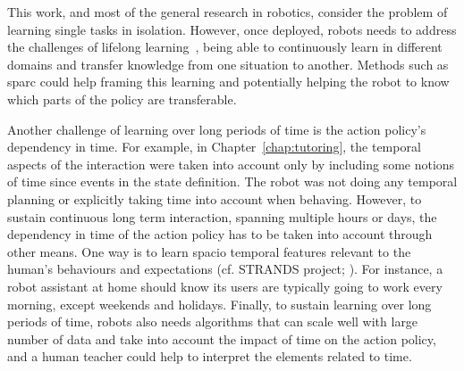 
This work, and most of the general research in robotics, consider the problem of learning single tasks in isolation. However, once deployed, robots needs to address the challenges of lifelong learning~\citep{thrun1995lifelong}, being able to continuously learn in different domains and transfer knowledge from one situation to another. Methods such as \gls{sparc} could help framing this learning and potentially helping the robot to know which parts of the policy are transferable.

Another challenge of learning over long periods of time is the action policy's dependency in time. For example, in Chapter~\ref{chap:tutoring}, the temporal aspects of the interaction were taken into account only by including some notions of time since events in the state definition. The robot was not doing any temporal planning or explicitly taking time into account when behaving. However, to sustain continuous long term interaction, spanning multiple hours or days, the dependency in time of the action policy has to be taken into account through other means. One way is to learn spacio temporal features relevant to the human's behaviours and expectations (cf. STRANDS project; \citealt{hawes2017strands}). For instance, a robot assistant at home should know its users are typically going to work every morning, except weekends and holidays. Finally, to sustain learning over long periods of time, robots also needs algorithms that can scale well with large number of data and take into account the impact of time on the action policy, and a human teacher could help to interpret the elements related to time.

